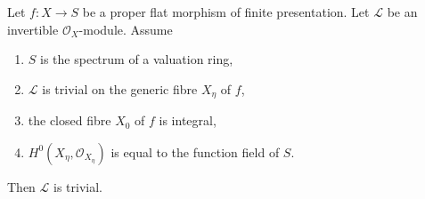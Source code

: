 \begin{lemma}
\label{lemma-triviality-generic-fibre-valuation-ring}
Let $f : X \to S$ be a proper flat morphism of finite presentation.
Let $\mathcal{L}$ be an invertible $\mathcal{O}_X$-module.
Assume
\begin{enumerate}
\item $S$ is the spectrum of a valuation ring,
\item $\mathcal{L}$ is trivial on the generic fibre $X_\eta$ of $f$,
\item the closed fibre $X_0$ of $f$ is integral,
\item $H^0(X_\eta, \mathcal{O}_{X_\eta})$ is equal to the function field of $S$.
\end{enumerate}
Then $\mathcal{L}$ is trivial.
\end{lemma}

